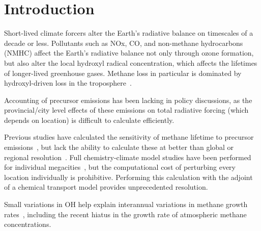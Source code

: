 \section{Introduction}

Short-lived climate forcers alter the Earth's radiative balance on timescales of a decade or less. Pollutants such as NOx, CO, and non-methane hydrocarbons (NMHC) affect the Earth's radiative balance not only through ozone formation, but also alter the local hydroxyl radical concentration, which affects the lifetimes of longer-lived greenhouse gases. Methane loss in particular is dominated by hydroxyl-driven loss in the troposphere~\citep{ref:kirschke2013}.

Accounting of precursor emissions has been lacking in policy discussions, as the provincial/city level effects of these emissions on total radiative forcing (which depends on location) is difficult to calculate efficiently.

Previous studies have calculated the sensitivity of methane lifetime to precursor emissions~\citep{ref:holmes2013}, but lack the ability to calculate these at better than global or regional resolution~\citep{ref:naik2005,ref:macintosh2015}. Full chemistry-climate model studies have been performed for individual megacities~\citep{ref:dang2015}, but the computational cost of perturbing every location individually is prohibitive. Performing this calculation with the adjoint of a chemical transport model provides unprecedented resolution.

Small variations in OH help explain interannual variations in methane growth rates~\citep{ref:mcnorton2016}, including the recent hiatus in the growth rate of atmospheric methane concentrations.